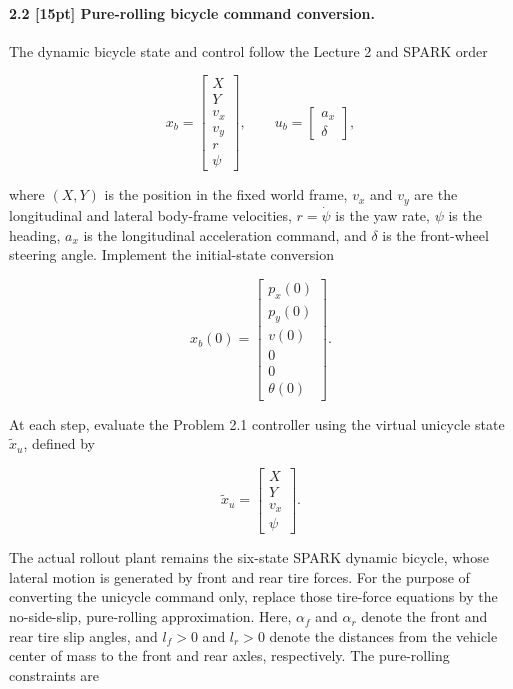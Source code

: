\solution{}

\paragraph{2.2 [15pt] Pure-rolling bicycle command conversion.}
The dynamic bicycle state and control follow the Lecture 2 and SPARK order

\begin{equation}
x_b=
\begin{bmatrix}X\\Y\\v_x\\v_y\\r\\\psi\end{bmatrix},
\qquad
u_b=
\begin{bmatrix}a_x\\\delta\end{bmatrix},
\end{equation}

where $(X,Y)$ is the position in the fixed world frame, $v_x$ and $v_y$ are the
longitudinal and lateral body-frame velocities, $r=\dot\psi$ is the yaw rate,
$\psi$ is the heading, $a_x$ is the longitudinal acceleration command, and
$\delta$ is the front-wheel steering angle. Implement the initial-state
conversion

\begin{equation}\label{eq:state-conversion}
x_b(0)=
\begin{bmatrix}
p_x(0)\\p_y(0)\\v(0)\\0\\0\\\theta(0)
\end{bmatrix}.
\end{equation}

At each step, evaluate the Problem 2.1 controller using the virtual unicycle
state $\widetilde{x}_u$, defined by

\begin{equation}
\widetilde{x}_u=
\begin{bmatrix}X\\Y\\v_x\\\psi\end{bmatrix}.
\end{equation}

The actual rollout plant remains the six-state SPARK dynamic bicycle, whose
lateral motion is generated by front and rear tire forces. For the purpose of
converting the unicycle command only, replace those tire-force equations by
the no-side-slip, pure-rolling approximation. Here, $\alpha_f$ and $\alpha_r$
denote the front and rear tire slip angles, and $l_f>0$ and $l_r>0$ denote the
distances from the vehicle center of mass to the front and rear axles,
respectively. The pure-rolling constraints are

